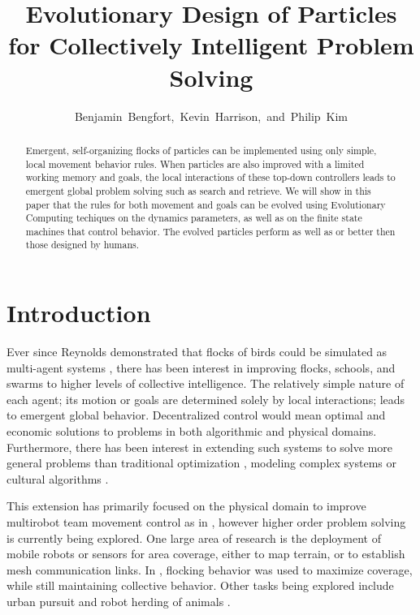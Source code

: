 \documentclass[12pt,journal,compsoc]{IEEEtran}
\begin{document}
\title{Evolutionary Design of Particles for Collectively Intelligent Problem Solving}
\author{Benjamin~Bengfort,~Kevin~Harrison,~and~Philip~Kim}

\maketitle

\begin{abstract}

Emergent, self-organizing flocks of particles can be implemented using only simple, local movement behavior rules. When particles are also improved with a limited working memory and goals, the local interactions of these top-down controllers leads to emergent global problem solving such as search and retrieve. We will show in this paper that the rules for both movement and goals can be evolved using Evolutionary Computing techiques on the dynamics parameters, as well as on the finite state machines that control behavior. The evolved particles perform as well as or better then those designed by humans.

\end{abstract}

\section{Introduction}

Ever since Reynolds demonstrated that flocks of birds could be simulated as multi-agent systems \cite{reynolds1987flocks}, there has been interest in improving flocks, schools, and swarms to higher levels of collective intelligence. The relatively simple nature of each agent; its motion or goals are determined solely by local interactions; leads to emergent global behavior. Decentralized control would mean optimal and economic solutions to problems in both algorithmic and physical domains. Furthermore, there has been interest in extending such systems to solve more general problems than traditional optimization \cite{kennedy1995particle}, modeling complex systems \cite{ottino2003complex,clerc2002particle} or cultural algorithms \cite{chung1996testbed}.

This extension has primarily focused on the physical domain to improve multirobot team movement control as in \cite{balch1998behavior,ccelikkanat2010steering,hodgins1994robot}, however higher order problem solving is currently being explored. One large area of research is the deployment of mobile robots or sensors for area coverage, either to map terrain, or to establish mesh communication links. In \cite{cheng2009distributed}, flocking behavior was used to maximize coverage, while still maintaining collective behavior. Other tasks being explored include urban pursuit \cite{winder2004using} and robot herding of animals \cite{vaughan1998robot}.
\end{document}
